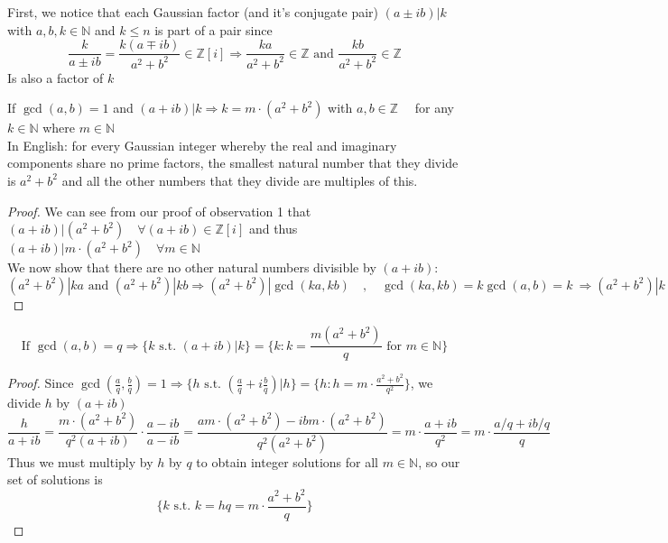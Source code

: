 \documentclass[11pt]{article}
\newcommand{\N}{\mathbb{N}}
\newcommand{\Z}{\mathbb{Z}}
\newcommand{\RA}{\Rightarrow}
\newenvironment{problem}[2][\to]{\begin{trivlist}
\item[\hskip \labelsep {\bfseries #1}\hskip \labelsep {\bfseries #2.}]}{\end{trivlist}}
\begin{document}
First, we notice that each Gaussian factor (and it's conjugate pair) $(a\pm ib) | k$ with $a,b,k\in \N$ and $k \leq n$ is part of a pair since 
$$\frac{k}{a\pm ib} = \frac{k(a\mp ib)}{a^2+b^2} \in\Z[i] \RA \frac{ka}{a^2+b^2}\in\Z \text{ and } \frac{kb}{a^2+b^2}\in\Z$$
Is also a factor of $k$\\

\begin{problem}[Observation 2]\\
    If $\gcd(a,b)=1$ and $(a+ib)|k \RA k = m\cdot (a^2+b^2)$ with $a,b\in \Z\quad$ for any $k\in\N$ where $m\in\N$\\
    In English: for every Gaussian integer whereby the real and imaginary components share no prime factors, the smallest natural number that they divide is $a^2+b^2$ and all the other numbers that they divide are multiples of this.
\end{problem}
\begin{proof}
    We can see from our proof of observation 1 that $(a+ib)|(a^2+b^2)\quad \forall (a+ib)\in\Z[i]$ and thus $(a+ib)|m\cdot (a^2+b^2)\quad \forall m\in\N$\\
    We now show that there are no other natural numbers divisible by $(a+ib)$: 
    $$
    (a^2+b^2)|ka \text{ and } (a^2+b^2)|kb \RA (a^2+b^2)|\gcd(ka,kb)\quad,\quad\gcd(ka,kb)=k\gcd(a,b)=k\ \RA (a^2+b^2)|k
    $$
\end{proof}

\begin{problem}[Corollary 1]\\
    $$\text{If }\gcd(a,b) = q \RA \{k\text{ s.t. }(a+ib)|k\} = \{ k : k=\frac{m(a^2+b^2)}{q} \text{ for }m\in\N\}$$
\end{problem}
\begin{proof}
    Since $\gcd(\frac{a}{q},\frac{b}{q})=1 \RA \{h\text{ s.t. } (\frac{a}{q}+i\frac{b}{q})|h\} = 
    \{h : h=m\cdot\frac{a^2+b^2}{q^2}\}$, we divide $h$ by $(a+ib)$
    $$
    \frac{h}{a+ib} = \frac{m\cdot(a^2+b^2)}{q^2(a+ib)}\cdot\frac{a-ib}{a-ib} = \frac{am\cdot(a^2+b^2) - ibm\cdot(a^2+b^2)}{q^2(a^2+b^2)} = m\cdot\frac{a+ib}{q^2} = m\cdot\frac{a/q+ib/q}{q}
    $$
    Thus we must multiply by $h$ by $q$ to obtain integer solutions for all $m\in\N$, so our set of solutions is 
    $$
    \{ k\text{ s.t. } k=hq=m\cdot\frac{a^2+b^2}{q} \}
    $$
    
\end{proof}
\end{document}
